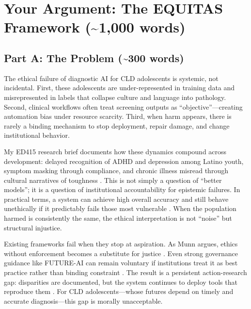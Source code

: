 \newpage
\section{Your Argument: The EQUITAS Framework (\texorpdfstring{\textasciitilde}{~}1,000 words)}

\subsection{Part A: The Problem (\texorpdfstring{\textasciitilde}{~}300 words)}
The ethical failure of diagnostic AI for CLD adolescents is systemic, not incidental. First, these adolescents are under-represented in training data and misrepresented in labels that collapse culture and language into pathology. Second, clinical workflows often treat screening outputs as ``objective''—creating automation bias under resource scarcity. Third, when harm appears, there is rarely a binding mechanism to stop deployment, repair damage, and change institutional behavior.

\vspace{0.5em}
My ED415 research brief documents how these dynamics compound across development: delayed recognition of ADHD and depression among Latino youth, symptom masking through compliance, and chronic illness misread through cultural narratives of toughness \citep{GarciaBautista2025PuzzlePlan}. This is not simply a question of ``better models''; it is a question of institutional accountability for epistemic failures. In practical terms, a system can achieve high overall accuracy and still behave unethically if it predictably fails those most vulnerable \citep{Marko2025}. When the population harmed is consistently the same, the ethical interpretation is not ``noise'' but structural injustice.

\vspace{0.5em}
Existing frameworks fail when they stop at aspiration. As Munn argues, ethics without enforcement becomes a substitute for justice \citep{Munn2023}. Even strong governance guidance like FUTURE-AI can remain voluntary if institutions treat it as best practice rather than binding constraint \citep{Lekadir2025}. The result is a persistent action-research gap: disparities are documented, but the system continues to deploy tools that reproduce them \citep{Marko2025}. For CLD adolescents—whose futures depend on timely and accurate diagnosis—this gap is morally unacceptable.

